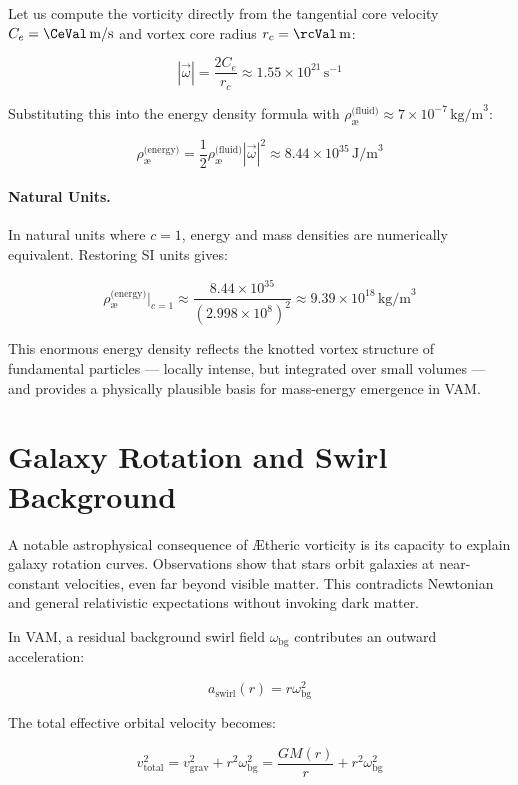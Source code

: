 \documentclass[12pt]{article}
\begin{document}
    Let us compute the vorticity directly from the tangential core velocity \( C_e = \CeVal \, \text{m/s} \) and vortex core radius \( r_c = \rcVal \, \text{m} \):

    \[
        |\vec{\omega}| = \frac{2 C_e}{r_c} \approx 1.55 \times 10^{21} \, \text{s}^{-1}
    \]

    Substituting this into the energy density formula with \( \rho_{\text{\ae}}^{\text{(fluid)}} \approx 7 \times 10^{-7} \, \text{kg/m}^3 \):

    \[
        \rho_{\text{\ae}}^{\text{(energy)}} = \frac{1}{2} \rho_{\text{\ae}}^{\text{(fluid)}} |\vec{\omega}|^2 \approx 8.44 \times 10^{35} \, \text{J/m}^3
    \]

    \paragraph{Natural Units.}
    In natural units where \( c = 1 \), energy and mass densities are numerically equivalent. Restoring SI units gives:

    \[
        \rho_{\text{\ae}}^{\text{(energy)}} \Big|_{c=1} \approx \frac{8.44 \times 10^{35}}{(2.998 \times 10^8)^2} \approx 9.39 \times 10^{18} \, \text{kg/m}^3
    \]

    This enormous energy density reflects the knotted vortex structure of fundamental particles — locally intense, but integrated over small volumes — and provides a physically plausible basis for mass-energy emergence in VAM.


    \section{Galaxy Rotation and Swirl Background}

    A notable astrophysical consequence of \AE{}theric vorticity is its capacity to explain galaxy rotation curves. Observations show that stars orbit galaxies at near-constant velocities, even far beyond visible matter. This contradicts Newtonian and general relativistic expectations without invoking dark matter.

    In VAM, a residual background swirl field $\omega_{\text{bg}}$ contributes an outward acceleration:

    \[
        a_{\text{swirl}}(r) = r \omega_{\text{bg}}^2
    \]

    The total effective orbital velocity becomes:

    \[
        v_{\text{total}}^2 = v_{\text{grav}}^2 + r^2 \omega_{\text{bg}}^2 = \frac{G M(r)}{r} + r^2 \omega_{\text{bg}}^2
    \]
\end{document}
